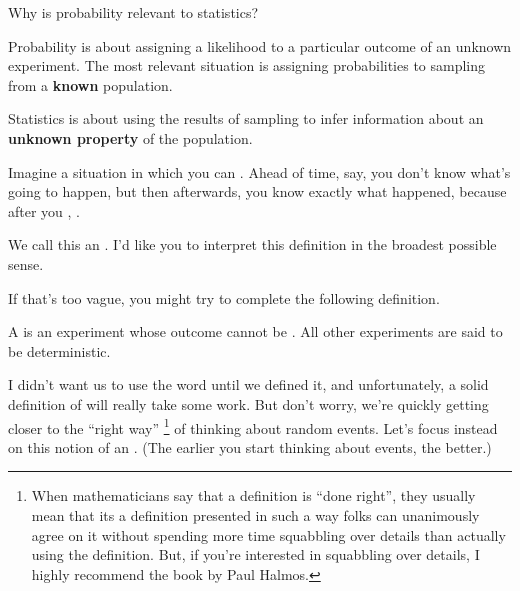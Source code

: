 \documentclass{ccg-topic}
\author{Colton Grainger}
\date{\today}
\begin{document}
\frontstuff

\newcommand{\answer}[1]{\color{blue}#1}

Why is probability relevant to statistics?
    
Probability is about assigning a likelihood to a particular outcome of an unknown experiment. The most relevant situation is assigning probabilities to sampling from a \textbf{known} population.
            
Statistics is about using the results of sampling to infer information about an \textbf{unknown property} of the population.

\printindex


Imagine a situation in which you can . Ahead of time, say, you don't know what's going to happen, but then afterwards, you know exactly what happened, because after you , . 

\begin{defn}[]
    \label{defn:experiment}
    We call this  an . I'd like you to interpret this definition in the broadest possible sense. 
\end{defn}

If that's too vague, you might try to complete the following definition.

\begin{defn}
    \label{defn:random_experiment}
    A  is an experiment whose outcome cannot be . All other experiments are said to be deterministic. 
\end{defn}

I didn't want us to use the word  until we defined it, and unfortunately, a solid definition of  will really take some work. But don't worry, we're quickly getting closer to the ``right way''%
    \footnote{%
        When mathematicians say that a definition is ``done right'', they usually mean that its a definition presented in such a way folks can unanimously agree on it without spending more time squabbling over details than actually using the definition. But, if you're interested in squabbling over details, I highly recommend the book  by Paul Halmos.
    } of thinking about random events. Let's focus instead on this notion of an . (The earlier you start thinking about events, the better.)
\end{document}
